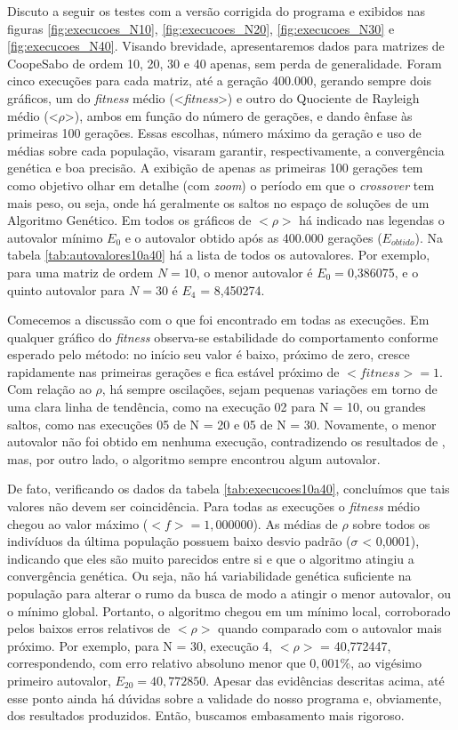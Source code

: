 	Discuto a seguir os testes com a versão corrigida do programa e exibidos nas figuras \ref{fig:execucoes_N10}, \ref{fig:execucoes_N20}, \ref{fig:execucoes_N30} e \ref{fig:execucoes_N40}. Visando brevidade, apresentaremos dados para matrizes de Coope\-Sabo de ordem 10, 20, 30 e 40 apenas, sem perda de generalidade. Foram cinco execuções para cada matriz, até a geração 400.000, gerando sempre dois gráficos, um do \textit{fitness} médio (<\textit{fitness}>) e outro do Quociente de Rayleigh médio (<$\rho$>), ambos em função do número de gerações, e dando ênfase às primeiras 100 gerações. Essas escolhas, número máximo da geração e uso de médias sobre cada população, visaram garantir, respectivamente, a convergência genética e boa precisão. A exibição de apenas as primeiras 100 gerações tem como objetivo olhar em detalhe (com \textit{zoom}) o período em que o \textit{crossover} tem mais peso, ou seja, onde há geralmente os saltos no espaço de soluções de um Algoritmo Genético. Em todos os gráficos de $<\rho>$ há indicado nas legendas o autovalor mínimo $E_0$ e o autovalor obtido após as 400.000 gerações ($E_{obtido}$). Na tabela \ref{tab:autovalores10a40} há a lista de todos os autovalores. Por exemplo, para uma matriz de ordem $N = 10$, o menor autovalor é $E_0 = $0,386075, e o quinto autovalor para $N = 30$ é $E_4$ = 8,450274.
	
	Comecemos a discussão com o que foi encontrado em todas as execuções. Em qualquer gráfico do \textit{fitness} observa-se estabilidade do comportamento conforme esperado pelo método: no início seu valor é baixo, próximo de zero, cresce rapidamente nas primeiras gerações e fica estável próximo de $<fitness> = 1$. Com relação ao $\rho$, há sempre oscilações, sejam pequenas variações em torno de uma clara linha de tendência, como na execução 02 para N = 10, ou grandes saltos, como nas execuções 05 de N = 20 e 05 de N = 30. Novamente, o menor autovalor não foi obtido em nenhuma execução, contradizendo os resultados de \cite{metodo2004}, mas, por outro lado, o algoritmo sempre encontrou algum autovalor.
	
	De fato, verificando os dados da tabela \ref{tab:execucoes10a40}, concluímos que tais valores não devem ser coincidência. Para todas as execuções o \textit{fitness} médio chegou ao valor máximo ($<f> = 1,000000$). As médias de $\rho$ sobre todos os indivíduos da última população possuem baixo desvio padrão ($\sigma$ < 0,0001), indicando que eles são muito parecidos entre si e que o algoritmo atingiu a convergência genética. Ou seja, não há variabilidade genética suficiente na população para alterar o rumo da busca de modo a atingir o menor autovalor, ou o mínimo global. Portanto, o algoritmo chegou em um mínimo local, corroborado pelos baixos erros relativos de $<\rho>$ quando comparado com o autovalor mais próximo. Por exemplo, para N = 30, execução 4,  $<\rho>$ = 40,772447, correspondendo, com erro relativo absoluno menor que $0,001\%$, ao vigésimo primeiro autovalor, $E_{20} = 40,772850$. Apesar das evidências descritas acima, até esse ponto ainda há dúvidas sobre a validade do nosso programa e, obviamente, dos resultados produzidos. Então, buscamos embasamento mais rigoroso.

